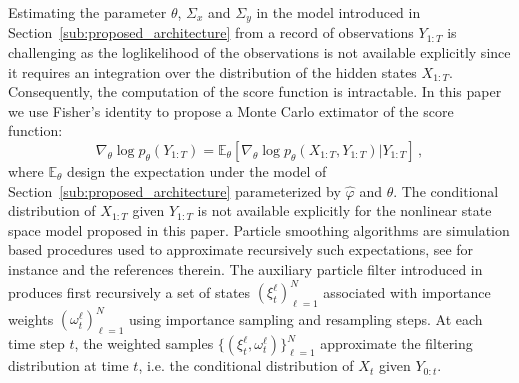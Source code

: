\documentclass{article}
\begin{document}
Estimating the parameter $\theta$,  $\Sigma_x$ and $\Sigma_y$ in the model introduced in Section~\ref{sub:proposed_architecture} from a record of observations $Y_{1:T}$ is challenging as the loglikelihood of the observations is not available explicitly since  it requires an integration over the distribution of the hidden states $X_{1:T}$. Consequently, the computation of the score function is intractable.
In this paper we use Fisher's identity to propose a Monte Carlo extimator of the score function:
\begin{equation}
	\nabla_\theta \log p_\theta(Y_{1:T}) = \mathbb{E}_\theta \left[ \nabla_\theta\log p_\theta(X_{1:T}, Y_{1:T}) | Y_{1:T} \right]\,,
	\label{eq:grad_ll}
\end{equation}
where $\mathbb{E}_\theta$ design the expectation under the model of Section~\ref{sub:proposed_architecture} parameterized by $\widehat \varphi$ and $\theta$. The conditional distribution of $X_{1:T}$ given $Y_{1:T}$ is not available explicitly for the nonlinear state space model proposed in this paper. %
Particle smoothing algorithms are simulation based procedures used to approximate recursively such expectations, see for instance \cite{} and the references therein.
The auxiliary particle filter introduced in \cite{Jun1998} produces first recursively a set of states $(\xi^{\ell}_t)_{\ell=1}^N$ associated with importance weights $(\omega^{\ell}_t)_{\ell=1}^N$ using importance sampling and resampling steps.
At each time step $t$, the weighted samples $\{(\xi^{\ell}_t,\omega^{\ell}_t)\}_{\ell=1}^N$ approximate the filtering distribution at time $t$, i.e. the conditional distribution of $X_t$ given $Y_{0:t}$.
\end{document}
